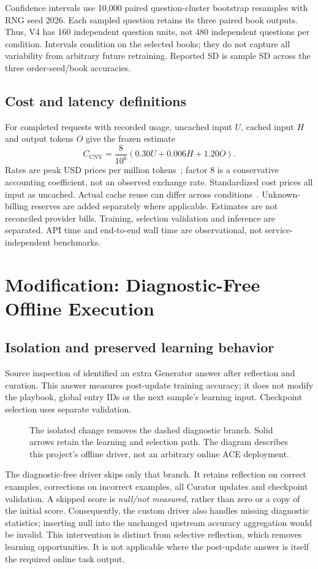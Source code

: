 \documentclass[10pt,a4paper]{article}
\newcommand{\art}[1]{\texttt{\small\detokenize{#1}}}
\begin{document}
Confidence intervals use 10,000 paired question-cluster bootstrap resamples with RNG seed 2026. Each sampled question retains its three paired book outputs. Thus, V4 has 160 independent question units, not 480 independent questions per condition. Intervals condition on the selected books; they do not capture all variability from arbitrary future retraining. Reported SD is sample SD across the three order-seed/book accuracies.

\subsection{Cost and latency definitions}
For completed requests with recorded usage, uncached input $U$, cached input $H$ and output tokens $O$ give the frozen estimate
\[
C_{\mathrm{CNY}}=\frac{8}{10^6}\left(0.30U+0.006H+1.20O\right).
\]
Rates are peak USD prices per million tokens~\cite{deepseekpricing}; factor 8 is a conservative accounting coefficient, not an observed exchange rate. Standardized cost prices all input as uncached. Actual cache reuse can differ across conditions~\cite{deepseekcache}. Unknown-billing reserves are added separately where applicable. Estimates are not reconciled provider bills. Training, selection validation and inference are separated. API time and end-to-end wall time are observational, not service-independent benchmarks.

\clearpage
\section{Modification: Diagnostic-Free Offline Execution}
\subsection{Isolation and preserved learning behavior}
Source inspection of \art{ACE._train_single_sample} identified an extra Generator answer after reflection and curation. This \art{_post_curate} answer measures post-update training accuracy; it does not modify the playbook, global entry IDs or the next sample's learning input. Checkpoint selection uses separate validation.

\begin{figure}[h!]
\centering
\caption{The isolated change removes the dashed diagnostic branch. Solid arrows retain the learning and selection path. The diagram describes this project's offline driver, not an arbitrary online ACE deployment.}
\label{fig:flow}
\end{figure}
The diagnostic-free driver skips only that branch. It retains reflection on correct examples, corrections on incorrect examples, all Curator updates and checkpoint validation. A skipped score is \emph{null/not measured}, rather than zero or a copy of the initial score. Consequently, the custom driver also handles missing diagnostic statistics; inserting null into the unchanged upstream accuracy aggregation would be invalid. This intervention is distinct from selective reflection, which removes learning opportunities. It is not applicable where the post-update answer is itself the required online task output.
\end{document}
